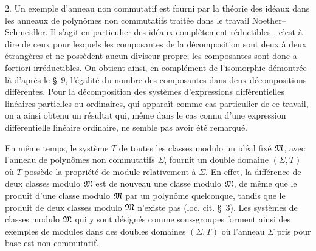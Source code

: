 2. Un exemple d'anneau non commutatif est fourni par la théorie des idéaux dans les anneaux de polynômes non commutatifs traitée dans le travail Noether--Schmeidler. Il s'agit en particulier des idéaux \og complètement réductibles \fg{}, c'est-à-dire de ceux pour lesquels les composantes de la décomposition sont deux à deux étrangères et ne possèdent aucun diviseur propre; les composantes sont donc a fortiori irréductibles. On obtient ainsi, en complément de l'isomorphie démontrée là d'après le \S~9, l'égalité du nombre des composantes dans deux décompositions différentes. Pour la décomposition des systèmes d'expressions différentielles linéaires partielles ou ordinaires, qui apparaît comme cas particulier de ce travail, on a ainsi obtenu un résultat qui, même dans le cas connu d'une expression différentielle linéaire ordinaire, ne semble pas avoir été remarqué.

En même temps, le système $T$ de toutes les classes modulo un idéal fixé $\mathfrak{M}$, avec l'anneau de polynômes non commutatifs $\Sigma$, fournit un double domaine $(\Sigma,T)$ où $T$ possède la propriété de module relativement à $\Sigma$. En effet, la différence de deux classes modulo $\mathfrak{M}$ est de nouveau une classe modulo $\mathfrak{M}$, de même que le produit d'une classe modulo $\mathfrak{M}$ par un polynôme quelconque, tandis que le produit de deux classes modulo $\mathfrak{M}$ n'existe pas (loc. cit. \S~3). Les systèmes de classes modulo $\mathfrak{M}$ qui y sont désignés comme \og sous-groupes \fg{} forment ainsi des exemples de modules dans des doubles domaines $(\Sigma,T)$ où l'anneau $\Sigma$ pris pour base est non commutatif.
